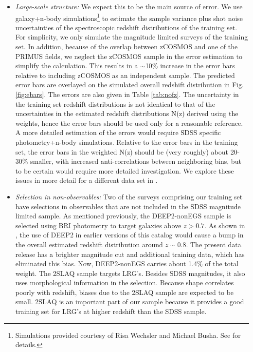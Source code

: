 \documentclass[preprint]{aastex}
\begin{document}
\begin{itemize}

\item {\it Large-scale structure: } We expect this to be the main source of
error.  We use galaxy+n-body simulations\footnote{Simulations provided courtesy of Risa Wechsler and
Michael Busha. See \cite{bushasimulations} for details.}
 to estimate the sample variance plus shot
noise uncertainties of the spectroscopic redshift distributions of the training
set.  For simplicity, we only simulate the magnitude limited surveys of the
training set.  In addition, because of the overlap between zCOSMOS and one of
the PRIMUS fields, we neglect the zCOSMOS sample in the error estimation to
simplify the calculation.  This results in a $\sim$10\% increase in the error
bars relative to including zCOSMOS as an independent sample.  The predicted
error bars are overlayed on the simulated overall redshift
distribution in Fig.
\ref{fig:ebars}.  The errors are also given in Table \ref{tab:nofz}. The
uncertainty in the training set redshift distributions is not identical to that
of the uncertainties in the estimated redshift distributions N(z) derived using
the weights, hence the error bars should be used only for a reasonable
reference.  A more detailed estimation of the errors would require SDSS
specific photometry+n-body simulations.  Relative to the error bars in the
training set, the error bars in the weighted N(z) should be (very roughly)
about 20-30\% smaller, with increased anti-correlations between neighboring
bins, but to be certain would require more detailed investigation.
We explore these issues in more detail for a different data set
in \citet{CunhaPhotozLSS11}.


\item {\it Selection in non-observables: } Two of the surveys comprising our
training set have selections in observables that are not included in the SDSS
magnitude limited sample.  As mentioned previously, the DEEP2-nonEGS sample is
selected using BRI photometry to target galaxies above $z>0.7$.  As shown in
\citet{CunhaPhotoz09}, the use of DEEP2 in earlier versions of this catalog
would cause a bump in the overall estimated redshift distribution around $z\sim
0.8$.  The present data release has a brighter magnitude cut and additional
training data, which has eliminated this bias.  
Now, DEEP2-nonEGS carries about 1.4\% of the total weight.  The 2SLAQ sample targets
LRG's.  Besides SDSS magnitudes, it also uses morphological information in the
selection.  Because shape correlates poorly with redshift, biases due to the
2SLAQ sample are expected to be small.  2SLAQ is an important part of our
sample because it provides a good training set for LRG's at higher redshift
than the SDSS sample.


\end{itemize}
\end{document}
